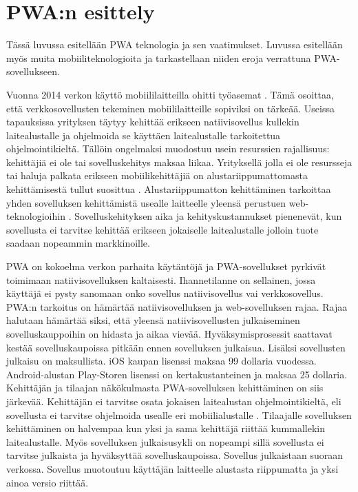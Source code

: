 \documentclass{tktltiki}
\begin{document}
\newpage
\section{PWA:n esittely}

Tässä luvussa esitellään PWA teknologia ja sen vaatimukset. Luvussa esitellään myös muita mobiiliteknologioita ja tarkastellaan niiden eroja verrattuna PWA-sovellukseen.

Vuonna 2014 verkon käyttö mobiililaitteilla ohitti työasemat \cite{tandelimpact}. Tämä osoittaa, että verkkosovellusten tekeminen mobiililaitteille sopiviksi on tärkeää. Useissa tapauksissa yrityksen täytyy kehittää erikseen natiivisovellus kullekin laitealustalle ja ohjelmoida se käyttäen laitealustalle tarkoitettua ohjelmointikieltä. Tällöin ongelmaksi muodostuu usein resurssien rajallisuus: kehittäjiä ei ole tai sovelluskehitys maksaa liikaa. Yrityksellä jolla ei ole resursseja tai haluja palkata erikseen mobiilikehittäjiä on alustariippumattomasta kehittämisestä tullut suosittua \cite{biorn2017progressive}. Alustariippumatton kehittäminen tarkoittaa yhden sovelluksen kehittämistä usealle laitteelle yleensä perustuen web-teknologioihin \cite{heitkotter2013cross}. Sovelluskehityksen aika ja kehityskustannukset pienenevät, kun sovellusta ei tarvitse kehittää erikseen jokaiselle laitealustalle jolloin tuote saadaan nopeammin markkinoille.

PWA on kokoelma verkon parhaita käytäntöjä \cite{Kapoor} ja PWA-sovellukset pyrkivät toimimaan natiivisovelluksen kaltaisesti. Ihannetilanne on sellainen, jossa käyttäjä ei pysty sanomaan onko sovellus natiivisovellus vai verkkosovellus. PWA:n tarkoitus on hämärtää natiivisovelluksen ja web-sovelluksen rajaa. Rajaa halutaan hämärtää siksi, että yleensä natiivisovellusten julkaiseminen sovelluskauppoihin on hidasta ja aikaa vievää. Hyväksymisprosessit saattavat kestää sovelluskaupoissa pitkään ennen sovelluksen julkaisua. Lisäksi sovellusten julkaisu on maksullista. iOS kaupan lisenssi maksaa 99 dollaria vuodessa. Android-alustan Play-Storen lisenssi on kertakustanteinen ja maksaa 25 dollaria. Kehittäjän ja tilaajan näkökulmasta PWA-sovelluksen kehittäminen on siis järkevää. Kehittäjän ei tarvitse osata jokaisen laitealustan ohjelmointikieltä, eli sovellusta ei tarvitse ohjelmoida usealle eri mobiilialustalle \cite{Gazdecki}. Tilaajalle sovelluksen kehittäminen on halvempaa kun yksi ja sama kehittäjä riittää kummallekin laitealustalle. Myös sovelluksen julkaisusykli on nopeampi sillä sovellusta ei tarvitse julkaista ja hyväksyttää sovelluskaupoissa. Sovellus julkaistaan suoraan verkossa. Sovellus muotoutuu käyttäjän laitteelle alustasta riippumatta ja yksi ainoa versio riittää.
\end{document}
